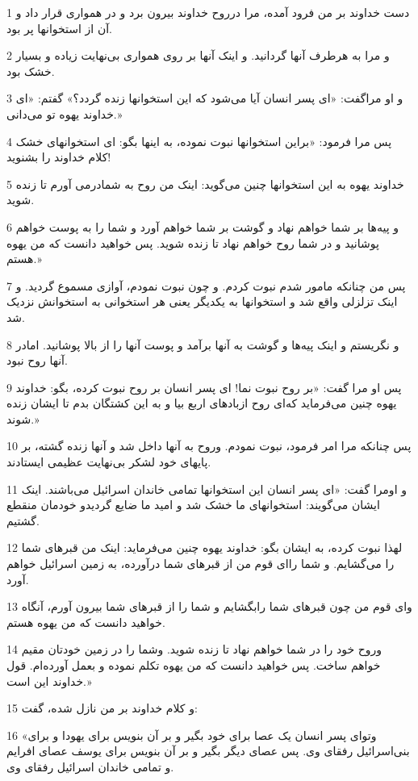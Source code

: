 \par 1 دست خداوند بر من فرود آمده، مرا درروح خداوند بیرون برد و در همواری قرار داد و آن از استخوانها پر بود.
\par 2 و مرا به هرطرف آنها گردانید. و اینک آنها بر روی همواری بی‌نهایت زیاده و بسیار خشک بود.
\par 3 و او مراگفت: «ای پسر انسان آیا می‌شود که این استخوانها زنده گردد؟» گفتم: «ای خداوند یهوه تو می‌دانی.»
\par 4 پس مرا فرمود: «براین استخوانها نبوت نموده، به اینها بگو: ای استخوانهای خشک کلام خداوند را بشنوید!
\par 5 خداوند یهوه به این استخوانها چنین می‌گوید: اینک من روح به شمادرمی آورم تا زنده شوید.
\par 6 و پیه‌ها بر شما خواهم نهاد و گوشت بر شما خواهم آورد و شما را به پوست خواهم پوشانید و در شما روح خواهم نهاد تا زنده شوید. پس خواهید دانست که من یهوه هستم.»
\par 7 پس من چنانکه مامور شدم نبوت کردم. و چون نبوت نمودم، آوازی مسموع گردید. و اینک تزلزلی واقع شد و استخوانها به یکدیگر یعنی هر استخوانی به استخوانش نزدیک شد.
\par 8 و نگریستم و اینک پیه‌ها و گوشت به آنها برآمد و پوست آنها را از بالا پوشانید. امادر آنها روح نبود.
\par 9 پس او مرا گفت: «بر روح نبوت نما! ای پسر انسان بر روح نبوت کرده، بگو: خداوند یهوه چنین می‌فرماید که‌ای روح ازبادهای اربع بیا و به این کشتگان بدم تا ایشان زنده شوند.»
\par 10 پس چنانکه مرا امر فرمود، نبوت نمودم. وروح به آنها داخل شد و آنها زنده گشته، بر پایهای خود لشکر بی‌نهایت عظیمی ایستادند.
\par 11 و اومرا گفت: «ای پسر انسان این استخوانها تمامی خاندان اسرائیل می‌باشند. اینک ایشان می‌گویند: استخوانهای ما خشک شد و امید ما ضایع گردیدو خودمان منقطع گشتیم.
\par 12 لهذا نبوت کرده، به ایشان بگو: خداوند یهوه چنین می‌فرماید: اینک من قبرهای شما را می‌گشایم. و شما را‌ای قوم من از قبرهای شما درآورده، به زمین اسرائیل خواهم آورد.
\par 13 و‌ای قوم من چون قبرهای شما رابگشایم و شما را از قبرهای شما بیرون آورم، آنگاه خواهید دانست که من یهوه هستم.
\par 14 وروح خود را در شما خواهم نهاد تا زنده شوید. وشما را در زمین خودتان مقیم خواهم ساخت. پس خواهید دانست که من یهوه تکلم نموده و بعمل آورده‌ام. قول خداوند این است.»
\par 15 و کلام خداوند بر من نازل شده، گفت:
\par 16 «وتو‌ای پسر انسان یک عصا برای خود بگیر و بر آن بنویس برای یهودا و برای بنی‌اسرائیل رفقای وی. پس عصای دیگر بگیر و بر آن بنویس برای یوسف عصای افرایم و تمامی خاندان اسرائیل رفقای وی.
